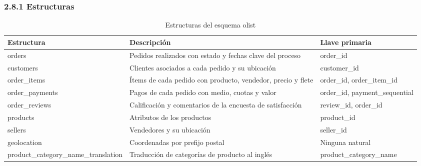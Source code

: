 \documentclass[a4paper,stu,12pt,donotrepeattitle,floatsintext]{apa7}
\begin{document}
\subsubsection{2.8.1 Estructuras}
{\footnotesize
\begin{longtable}{|>{\raggedright\arraybackslash}p{}|>{\raggedright\arraybackslash}p{}|>{\raggedright\arraybackslash}p{}|}
\caption{Estructuras del esquema olist}\\
\hline
\textbf{Estructura} & \textbf{Descripción} & \textbf{Llave primaria} \\ \hline
\endhead
orders & Pedidos realizados con estado y fechas clave del proceso & order\_\allowbreak{}id \\ \hline
customers & Clientes asociados a cada pedido y su ubicación & customer\_\allowbreak{}id \\ \hline
order\_\allowbreak{}items & Ítems de cada pedido con producto, vendedor, precio y flete & order\_\allowbreak{}id, order\_\allowbreak{}item\_\allowbreak{}id \\ \hline
order\_\allowbreak{}payments & Pagos de cada pedido con medio, cuotas y valor & order\_\allowbreak{}id, payment\_\allowbreak{}sequential \\ \hline
order\_\allowbreak{}reviews & Calificación y comentarios de la encuesta de satisfacción & review\_\allowbreak{}id, order\_\allowbreak{}id \\ \hline
products & Atributos de los productos & product\_\allowbreak{}id \\ \hline
sellers & Vendedores y su ubicación & seller\_\allowbreak{}id \\ \hline
geolocation & Coordenadas por prefijo postal & Ninguna natural \\ \hline
product\_\allowbreak{}category\_\allowbreak{}name\_\allowbreak{}translation & Traducción de categorías de producto al inglés & product\_\allowbreak{}category\_\allowbreak{}name \\ \hline
\end{longtable}
}
\end{document}
